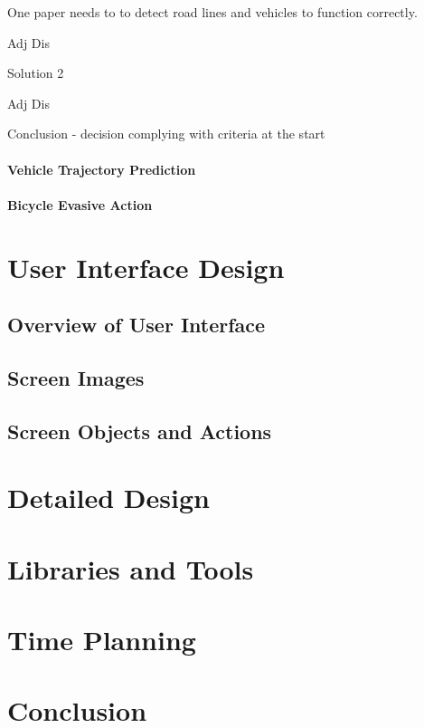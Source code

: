 \documentclass[]{report}
\begin{document}
One paper \citep{multi-cue} needs to to detect road lines and vehicles to function correctly. 

Adj 
Dis

Solution 2

Adj 
Dis

Conclusion - decision complying with criteria at the start

\subsubsection{Vehicle Trajectory Prediction}

\subsubsection{Bicycle Evasive Action}


\chapter{User Interface Design}
\section{Overview of User Interface}  
\section{Screen Images}
\section{Screen Objects and Actions}

\chapter{Detailed Design}

\chapter{Libraries and Tools}

\chapter{Time Planning}

\chapter{Conclusion}



\end{document}
